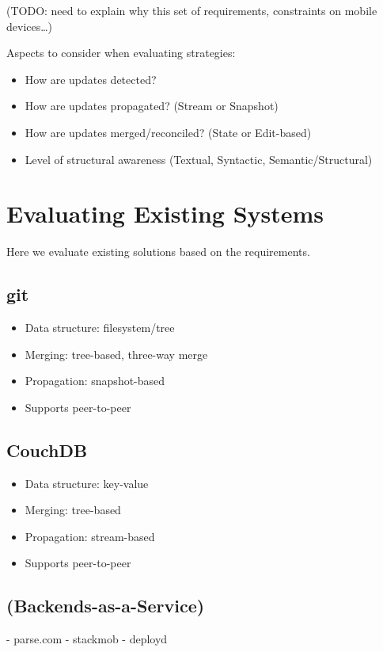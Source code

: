 (TODO: need to explain why this set of requirements, constraints on
mobile devices\ldots{})

Aspects to consider when evaluating strategies:

\begin{itemize}
\item How are updates detected?
\item How are updates propagated? (Stream or Snapshot)
\item How are updates merged/reconciled? (State or Edit-based)
\item Level of structural awareness (Textual, Syntactic, Semantic/Structural)
\end{itemize}

\section{Evaluating Existing Systems}
Here we evaluate existing solutions based on the requirements.

\subsection{git}

\begin{itemize}
\item
  Data structure: filesystem/tree
\item
  Merging: tree-based, three-way merge
\item
  Propagation: snapshot-based
\item
  Supports peer-to-peer
\end{itemize}

\subsection{CouchDB}

\begin{itemize}
\item
  Data structure: key-value
\item
  Merging: tree-based
\item
  Propagation: stream-based
\item
  Supports peer-to-peer
\end{itemize}

\subsection{(Backends-as-a-Service)}
- parse.com
- stackmob
- deployd

